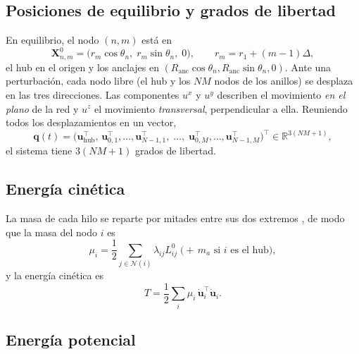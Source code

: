 \documentclass[11pt,letterpaper]{article}
\begin{document}
\subsection{Posiciones de equilibrio y grados de libertad}

En equilibrio, el nodo $(n,m)$ está en
\begin{equation}\label{eq:equil}
    \mathbf{X}^0_{n,m} = \bigl(r_m\cos\theta_n,\; r_m\sin\theta_n,\; 0\bigr),
    \qquad r_m = r_1 + (m-1)\Delta,
\end{equation}
el hub en el origen y los anclajes en
$(R_{\text{anc}}\cos\theta_n, R_{\text{anc}}\sin\theta_n, 0)$. Ante una
perturbación, cada nodo libre (el hub y los $NM$ nodos de los anillos) se
desplaza en las tres direcciones. Las componentes $u^x$ y $u^y$ describen el
movimiento \emph{en el plano} de la red y $u^z$ el movimiento
\emph{transversal}, perpendicular a ella. Reuniendo todos los
desplazamientos en un vector,
\begin{equation}\label{eq:q}
    \mathbf{q}(t)=\bigl(\mathbf{u}_{\text{hub}}^\top,\,
    \mathbf{u}_{0,1}^\top,\dots,\mathbf{u}_{N-1,1}^\top,\;\dots,\;
    \mathbf{u}_{0,M}^\top,\dots,\mathbf{u}_{N-1,M}^\top\bigr)^\top
    \in\mathbb{R}^{3(NM+1)},
\end{equation}
el sistema tiene $3(NM+1)$ grados de libertad.

\subsection{Energía cinética}

La masa de cada hilo se reparte por mitades entre sus dos extremos
\cite{meirovitch2001}, de modo que la masa del nodo $i$ es
\begin{equation}\label{eq:masas}
    \mu_i = \frac12\sum_{j\in\mathcal{N}(i)}\lambda_{ij}L^0_{ij}
    \;\bigl(+\,m_a \text{ si } i \text{ es el hub}\bigr),
\end{equation}
y la energía cinética es
\begin{equation}\label{eq:T}
    T=\frac12\sum_i \mu_i\,\dot{\mathbf{u}}_i^\top\dot{\mathbf{u}}_i .
\end{equation}

\subsection{Energía potencial}
\end{document}
